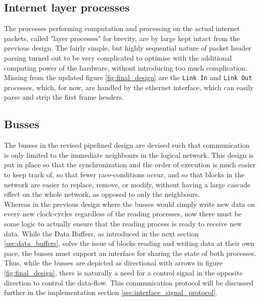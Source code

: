 \subsection{Internet layer processes} \label{sec:layer_processes}
The processes performing computation and processing on the actual internet 
packets, called "layer processes" for brevity, are by large kept intact from the 
previous design. The fairly simple, but highly sequential nature of packet 
header parsing turned out to be very complicated to optimise with the additional
computing power of the hardware, without introducing too much complication.\\
Missing from the updated figure \ref{fig:final_design} are the \texttt{Link In}
and \texttt{Link Out} processes, which, for now, are handled by the ethernet 
interface, which can easily parse and strip the first frame headers.


\subsection{Busses}
The busses in the revised pipelined design are devised such that communication 
is only limited to the immediate neighbours in the logical network. This design
is put in place so that the synchronization and the order of execution is much 
easier to keep track of, so that fewer race-conditions occur, and so that blocks 
in the network are easier to replace, remove, or modify, without having a large
cascade effect on the whole network, as opposed to only the neighbours.\\
Whereas in the previous design where the busses would simply write new data on
every new clock-cycles regardless of the reading processes, now there must be 
some logic to actually ensure that the reading process is ready to receive new 
data. While the Data Buffers, as introduced in the next section \ref{sec:data_buffers},
solve the issue of blocks reading and writing data at their own pace, the busses
must support an interface for sharing the state of both processes. Thus, while 
the busses are depicted as directional with arrows in figure \ref{fig:final_design},
there is naturally a need for a control signal in the opposite direction to 
control the data-flow. This communication protocol will be discussed further in 
the implementation section \ref{sec:interface_signal_protocol}.


